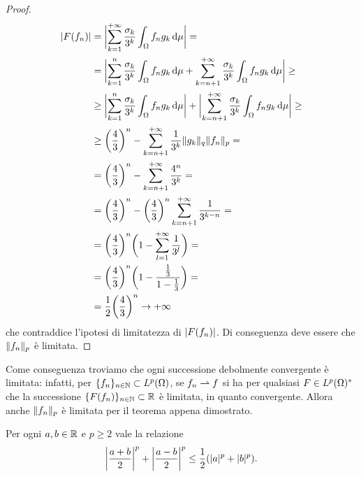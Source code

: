 \begin{proof}
    \begin{equation}
        \begin{split}
            \abs{F(f_n)}&=
            \abs[\bigg]{\sum_{k=1}^{+\infty}\frac{\sigma_k}{3^k}\int_\Omega f_ng_k\,\dd\mu}=\\&=
            \abs[\bigg]{\sum_{k=1}^{n}\frac{\sigma_k}{3^k}\int_\Omega f_ng_k\,\dd\mu+\sum_{k=n+1}^{+\infty}\frac{\sigma_k}{3^k}\int_\Omega f_ng_k\,\dd\mu}\ge\\&\ge
            \abs[\bigg]{\sum_{k=1}^{n}\frac{\sigma_k}{3^k}\int_\Omega f_ng_k\,\dd\mu}+\abs[\bigg]{\sum_{k=n+1}^{+\infty}\frac{\sigma_k}{3^k}\int_\Omega f_ng_k\,\dd\mu}\ge\\&\ge
            \biggl(\frac43\biggr)^n-\sum_{k=n+1}^{+\infty}\frac1{3^k}\norm{g_k}_q\norm{f_n}_p=\\&=
            \biggl(\frac43\biggr)^n-\sum_{k=n+1}^{+\infty}\frac{4^n}{3^k}=\\&=
            \biggl(\frac43\biggr)^n-\biggl(\frac43\biggr)^n\sum_{k=n+1}^{+\infty}\frac1{3^{k-n}}=\\&=
            \biggl(\frac43\biggr)^n\biggl(1-\sum_{l=1}^{+\infty}\frac1{3^l}\biggr)=\\&=
            \biggl(\frac43\biggr)^n\biggl(1-\frac{\frac13}{1-\frac13}\biggr)=\\&=
            \frac12\biggl(\frac43\biggr)^n\to+\infty
        \end{split}
    \end{equation}
    che contraddice l'ipotesi di limitatezza di $\abs{F(f_n)}$.
    Di conseguenza deve essere che $\norm{f_n}_p$ è limitata.
\end{proof}
Come conseguenza troviamo che ogni successione debolmente convergente è limitata: infatti, per $\{f_n\}_{n\in\N}\subset\leb[p]{\Omega}$, se $f_n\weakto f$ si ha per qualsiasi $F\in\dual{\leb[p]{\Omega}}$ che la successione $\{F(f_n)\}_{n\in\N}\subset\R$ è limitata, in quanto convergente.
Allora anche $\norm{f_n}_p$ è limitata per il teorema appena dimostrato.
\begin{lemma} \label{l:disuguaglianza-clarkson}
    Per ogni $a,b\in\R$ e $p\ge 2$ vale la relazione
    \begin{equation}
        \abs[\bigg]{\frac{a+b}2}^p+\abs[\bigg]{\frac{a-b}2}^p \le \frac12(\abs{a}^p+\abs{b}^p).
        \label{eq:disuguaglianza-clarkson}
    \end{equation}
\end{lemma}
